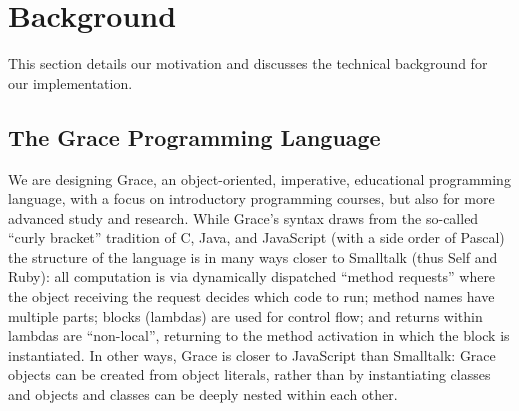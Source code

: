 
\section{Background}
\label{sec:background}

This section details our motivation and
discusses the technical background for our implementation.


%
%

\subsection{The Grace Programming Language}
\label{ssec:grace}



We are designing Grace, an object-oriented, imperative, educational programming
language, with a focus on introductory programming
courses, but also for more advanced study and research\citep{graceOnward12,graceSigcse13}.
While Grace's syntax draws
from the so-called ``curly bracket'' tradition of C, Java, and
JavaScript (with a side order of Pascal) the structure of the language
is in many ways closer to Smalltalk (thus Self and Ruby): 
all computation is via dynamically dispatched  ``method requests''
where the object receiving the request decides which code to run;
method names
have multiple parts; blocks (lambdas) are used for control flow; and
returns within lambdas are ``non-local'', returning to the method
activation in which the block is instantiated\citep{bluebook}.  In
other ways, Grace is closer to JavaScript than Smalltalk: Grace
objects can be created from object literals, rather than by
instantiating classes\citep{Black2007-emeraldHOPL,JonesECOOP2016} and
objects and classes can be deeply nested within each 
other\citep{betabook}.  


